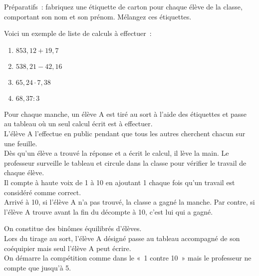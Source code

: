 \begin{TP}
Préparatifs : fabriquez une étiquette de carton pour chaque élève de la classe, comportant son nom et son prénom. Mélangez ces étiquettes.

Voici un exemple de liste de calculs à effectuer :
\begin{enumerate}
 \item $853,12 + 19,7$
 \item $538,21 - 42,16$
 \item $65,24 \cdot 7,38$
 \item $68,37 : 3$
 \end{enumerate}

Pour chaque manche, un élève A est tiré au sort à l'aide des étiquettes et passe au tableau où un seul calcul écrit est à effectuer. \\[0.5em]
L'élève A l'effectue en public pendant que tous les autres cherchent chacun sur une feuille. \\[0.5em]
Dès qu'un élève a trouvé la réponse et a écrit le calcul, il lève la main. Le professeur surveille le tableau et circule dans la classe pour vérifier le travail de chaque élève. \\[0.5em]
Il compte à haute voix de 1 à 10 en ajoutant 1 chaque fois qu'un travail est considéré comme correct. \\[0.5em]
Arrivé à 10, si l'élève A n'a pas trouvé, la classe a gagné la manche. Par contre, si l'élève A trouve avant la fin du décompte à 10, c'est lui qui a gagné.

On constitue des binômes équilibrés d'élèves.\\[0.5em]
Lors du tirage au sort, l'élève A désigné passe au tableau accompagné de son coéquipier mais seul l'élève A peut écrire. \\[0.5em]
On démarre la compétition comme dans le « 1 contre 10 » mais le professeur ne compte que jusqu'à 5. 
\end{TP}